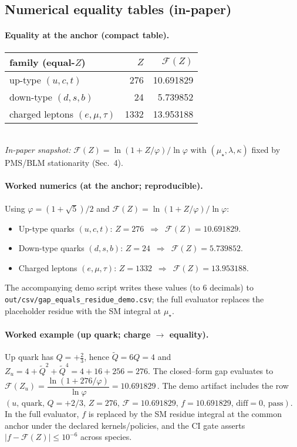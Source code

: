 \documentclass[epjc3]{svjour3}
\begin{document}
\subsection{Numerical equality tables (in-paper)}
\paragraph{Equality at the anchor (compact table).}
\begin{center}
\begin{tabular}{lrr} \toprule
family (equal-$Z$) & $Z$ & $\mathcal F(Z)$ \\ \midrule
up-type $(u,c,t)$ & 276  & 10.691829 \\
down-type $(d,s,b)$ & 24   & 5.739852 \\
charged leptons $(e,\mu,\tau)$ & 1332 & 13.953188 \\
\bottomrule
\end{tabular}\\[3pt]
\emph{In-paper snapshot:} $\mathcal F(Z)=\ln(1+Z/\varphi)/\ln\varphi$ with $(\mu_\star,\lambda,\kappa)$ fixed by PMS/BLM stationarity (Sec.~4).
\end{center}

\paragraph{Worked numerics (at the anchor; reproducible).}
Using $\varphi=(1+\sqrt5)/2$ and $\mathcal F(Z)=\ln(1+Z/\varphi)/\ln\varphi$:
\begin{itemize}
  \item Up-type quarks $(u,c,t)$: $Z=276$ \,$\Rightarrow$\, $\mathcal F(Z)=10.691829$.
  \item Down-type quarks $(d,s,b)$: $Z=24$ \,$\Rightarrow$\, $\mathcal F(Z)=5.739852$.
  \item Charged leptons $(e,\mu,\tau)$: $Z=1332$ \,$\Rightarrow$\, $\mathcal F(Z)=13.953188$.
\end{itemize}
The accompanying demo script writes these values (to 6 decimals) to \texttt{out/csv/gap\_equals\_residue\_demo.csv}; the full evaluator replaces the placeholder residue with the SM integral at $\mu_\star$.

\paragraph{Worked example (up quark; charge $\to$ equality).}
Up quark has $Q=+\tfrac{2}{3}$, hence $\tilde Q=6Q=4$ and
\(
  Z_u = 4 + \tilde Q^{2} + \tilde Q^{4} = 4 + 16 + 256 = 276.
\)
The closed--form gap evaluates to
\(
  \mathcal F(Z_u) = \dfrac{\ln(1+276/\varphi)}{\ln\varphi} = 10.691829\,.
\)
The demo artifact includes the row $(u,\,\text{quark},\,Q=+2/3,\,Z=276,\,\mathcal F=10.691829,\,f=10.691829,\,\text{diff}=0,\,\text{pass})$. In the full evaluator, $f$ is replaced by the SM residue integral at the common anchor under the declared kernels/policies, and the CI gate asserts $|f-\mathcal F(Z)|\le10^{-6}$ across species.
\end{document}
